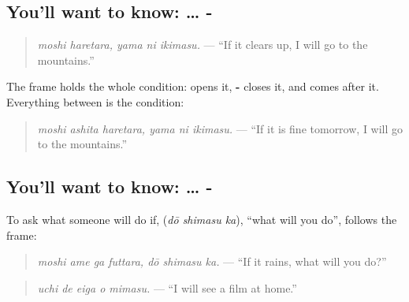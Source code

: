 \subsection*{You'll want to know:  … -}
\begin{quote}
\textbf{  }
\end{quote}

\begin{quote}
\emph{moshi haretara, yama ni ikimasu.} — \textquotedblleft{}If it clears up, I will go to the mountains.\textquotedblright{}
\end{quote}

The frame holds the whole condition: \textbf{} opens it, \textbf{-} closes it, and \textbf{} comes after it. Everything between is the condition:

\begin{quote}
\textbf{   }
\end{quote}

\begin{quote}
\emph{moshi ashita haretara, yama ni ikimasu.} — \textquotedblleft{}If it is fine tomorrow, I will go to the mountains.\textquotedblright{}
\end{quote}

\subsection*{You'll want to know:  … - }
To ask what someone will do if, \textbf{ } (\emph{dō shimasu ka}), \textquotedblleft{}what will you do\textquotedblright{}, follows the frame:

\begin{quote}
\textbf{   }
\end{quote}

\begin{quote}
\emph{moshi ame ga futtara, dō shimasu ka.} — \textquotedblleft{}If it rains, what will you do?\textquotedblright{}
\end{quote}

\begin{quote}
\textbf{  }
\end{quote}

\begin{quote}
\emph{uchi de eiga o mimasu.} — \textquotedblleft{}I will see a film at home.\textquotedblright{}
\end{quote}

